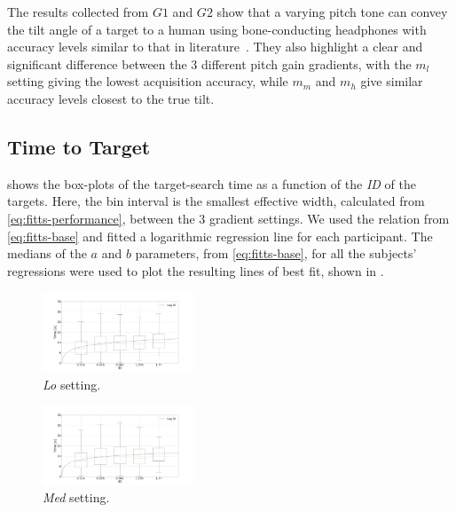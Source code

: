 \documentclass[sigconf, screen=true, anonymous=true]{acmart}
\begin{document}
The results collected from $G1$ and $G2$ show that a varying pitch tone can convey the tilt angle of a target to a human using bone-conducting headphones with accuracy levels similar to that in literature~\cite{bujacz2011sonification, katz2011spatial, zotkin2004rendering}.
They also highlight a clear and significant difference between the 3 different pitch gain gradients, with the $m_l$ setting giving the lowest acquisition accuracy, while $m_m$ and $m_h$ give similar accuracy levels closest to the true tilt. 

\subsection{Time to Target}

 shows the box-plots of the target-search time as a function of the \emph{ID} of the targets.
Here, the bin interval is the smallest effective width, calculated from \cref{eq:fitts-performance}, between the 3 gradient settings.
We used the relation from \cref{eq:fitts-base} and fitted a logarithmic regression line for each participant.
The medians of the $a$ and $b$ parameters, from \cref{eq:fitts-base}, for all the subjects' regressions were used to plot the resulting lines of best fit, shown in . 

\begin{figure}
  \centering
  \includegraphics[clip, trim=120 20 120 20, width=0.4\textwidth]{figures/fitts_lo.png}
  \caption{\emph{Lo} setting. }\label{fig:fitts-lo}
\end{figure}

\begin{figure}
  \centering
  \includegraphics[clip, trim=120 20 120 20, width=0.4\textwidth]{figures/fitts_med.png}
  \caption{\emph{Med} setting. }\label{fig:fitts-med}
\end{figure}
\end{document}
